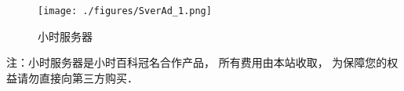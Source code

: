 
\begin{issues}
\issueDraft
\end{issues}

\begin{figure}[ht]
\centering
\texttt{[image: ./figures/SverAd\_1.png]}
\caption{小时服务器} \label{SverAd_fig1}
\end{figure}

注：小时服务器是小时百科冠名合作产品， 所有费用由本站收取， 为保障您的权益请勿直接向第三方购买．
